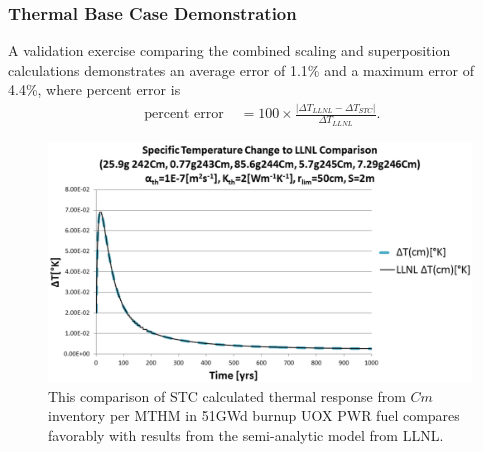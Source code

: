 
\begin{frame}[ctb!]
  \frametitle{Thermal Base Case Demonstration}
A validation exercise comparing the combined scaling and  
superposition calculations demonstrates an average error of 1.1\% and a 
maximum error of 4.4\%, where percent error is 
\begin{align}
\mbox{ percent error } &= 100\times\frac{\left|\Delta T_{LLNL} - \Delta 
T_{STC}\right|}{ \Delta T_{LLNL}}.
\end{align}
\begin{figure}[htp!]
\begin{center}
\includegraphics[width=\columnwidth]{./thermal_demonstration/CmValidation.eps}
\end{center}
\caption{This comparison of STC calculated thermal response from $Cm$ 
inventory per MTHM in 51GWd burnup UOX PWR fuel compares favorably with results 
from the semi-analytic model from LLNL.} 
\label{fig:CmValidation}
\end{figure}
\end{frame}


